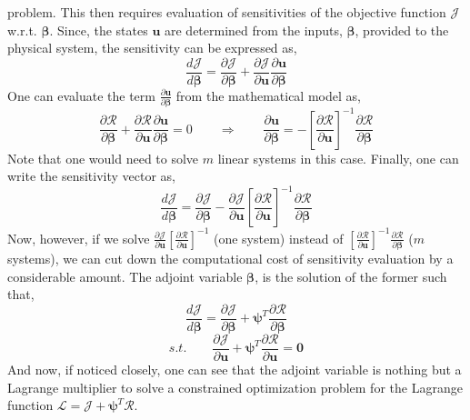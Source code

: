 \documentclass{article}
\begin{document}
    problem. This then requires evaluation of sensitivities of the objective function $\mathscr{J}$ w.r.t. $\boldsymbol{\beta}$. Since, the states $\boldsymbol{u}$
    are determined from the inputs, $\boldsymbol{\beta}$, provided to the physical system, the sensitivity can be expressed as,
    $$
    \frac{d\mathscr{J}}{d\boldsymbol{\beta}} = \frac{\partial\mathscr{J}}{\partial\boldsymbol{\beta}} + 
                                               \frac{\partial\mathscr{J}}{\partial\boldsymbol{u}}\frac{\partial\boldsymbol{u}}{\partial\boldsymbol{\beta}}
    $$
    One can evaluate the term $\displaystyle\frac{\partial\boldsymbol{u}}{\partial\boldsymbol{\beta}}$ from the mathematical model as,
    $$
    \frac{\partial\boldsymbol{\mathcal{R}}}{\partial\boldsymbol{\beta}} + 
    \frac{\partial\boldsymbol{\mathcal{R}}}{\partial\boldsymbol{u}}\frac{\partial\boldsymbol{u}}{\partial\boldsymbol{\beta}} = 0
    \qquad\Rightarrow\qquad
    \frac{\partial\boldsymbol{u}}{\partial\boldsymbol{\beta}} = -\left[\frac{\partial\boldsymbol{\mathcal{R}}}{\partial\boldsymbol{u}}\right]^{-1}
                                                                 \frac{\partial\boldsymbol{\mathcal{R}}}{\partial\boldsymbol{\beta}}
    $$
    Note that one would need to solve $m$ linear systems in this case. Finally, one can write the sensitivity vector as,
    $$
    \frac{d\mathscr{J}}{d\boldsymbol{\beta}} = \frac{\partial\mathscr{J}}{\partial\boldsymbol{\beta}} - 
                                               \frac{\partial\mathscr{J}}{\partial\boldsymbol{u}}
                                               \left[\frac{\partial\boldsymbol{\mathcal{R}}}{\partial\boldsymbol{u}}\right]^{-1}
                                               \frac{\partial\boldsymbol{\mathcal{R}}}{\partial\boldsymbol{\beta}}
    $$
    Now, however, if we solve $\displaystyle\frac{\partial\mathscr{J}}{\partial\boldsymbol{u}}
                               \left[\frac{\partial\boldsymbol{\mathcal{R}}}{\partial\boldsymbol{u}}\right]^{-1}$ (one system) instead of
    $\displaystyle\left[\frac{\partial\boldsymbol{\mathcal{R}}}{\partial\boldsymbol{u}}\right]^{-1}
     \frac{\partial\boldsymbol{\mathcal{R}}}{\partial\boldsymbol{\beta}}$ ($m$ systems), we can cut down the computational cost of sensitivity evaluation
    by a considerable amount. The adjoint variable $\boldsymbol{\beta}$, is the solution of the former such that,
    $$
    \frac{d\mathscr{J}}{d\boldsymbol{\beta}} = \frac{\partial\mathscr{J}}{\partial\boldsymbol{\beta}} + 
                                               \boldsymbol{\psi}^T\frac{\partial\boldsymbol{\mathcal{R}}}{\partial\boldsymbol{\beta}}
    $$
    $$
    s.t. \qquad \frac{\partial\mathscr{J}}{\partial\boldsymbol{u}} + \boldsymbol{\psi}^T\frac{\partial\boldsymbol{\mathcal{R}}}{\partial\boldsymbol{u}} = 
                \boldsymbol{0}
    $$
    And now, if noticed closely, one can see that the adjoint variable is nothing but a Lagrange multiplier to solve a constrained optimization problem for the
    Lagrange function $\mathscr{L}=\mathscr{J}+\boldsymbol{\psi}^T\boldsymbol{\mathcal{R}}$.
%
%
\end{document}
